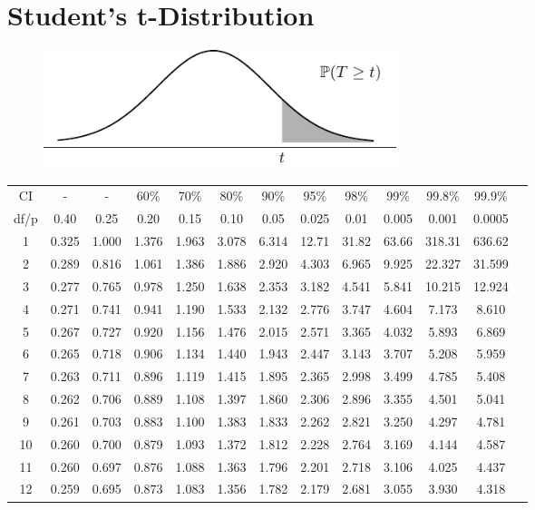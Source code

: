 \chapter{Student’s t-Distribution}
\begin{figure}[H]
\centering
\includegraphics[width=0.5\textwidth]{Figures/Apdx_tTable.pdf}
\end{figure}
\begin{table}[ht]
\centering
\begin{tabular}{c|c c c c c c c c c c c c}
	\hline
	CI & - & - & 60\% & 70\% & 80\% & 90\% & 95\% & 98\% & 99\% & 99.8\% & 99.9\%  \\
	df/p & 0.40 & 0.25 & 0.20 & 0.15 & 0.10 & 0.05 & 0.025 & 0.01 & 0.005 & 0.001 & 0.0005 \\\hline
	1 & 0.325 & 1.000 & 1.376 & 1.963 & 3.078 & 6.314 & 12.71 & 31.82 & 63.66 & 318.31 & 636.62 \\
	2 & 0.289 & 0.816 & 1.061 & 1.386 & 1.886 & 2.920 & 4.303 & 6.965 & 9.925 & 22.327 & 31.599 \\
	3 & 0.277 & 0.765 & 0.978 & 1.250 & 1.638 & 2.353 & 3.182 & 4.541 & 5.841 & 10.215 & 12.924 \\
	4 & 0.271 & 0.741 & 0.941 & 1.190 & 1.533 & 2.132 & 2.776 & 3.747 & 4.604 & 7.173 & 8.610 \\
	5 & 0.267 & 0.727 & 0.920 & 1.156 & 1.476 & 2.015 & 2.571 & 3.365 & 4.032 & 5.893 & 6.869 \\
	6 & 0.265 & 0.718 & 0.906 & 1.134 & 1.440 & 1.943 & 2.447 & 3.143 & 3.707 & 5.208 & 5.959 \\
	7 & 0.263 & 0.711 & 0.896 & 1.119 & 1.415 & 1.895 & 2.365 & 2.998 & 3.499 & 4.785 & 5.408 \\
	8 & 0.262 & 0.706 & 0.889 & 1.108 & 1.397 & 1.860 & 2.306 & 2.896 & 3.355 & 4.501 & 5.041 \\
	9 & 0.261 & 0.703 & 0.883 & 1.100 & 1.383 & 1.833 & 2.262 & 2.821 & 3.250 & 4.297 & 4.781 \\
	10 & 0.260 & 0.700 & 0.879 & 1.093 & 1.372 & 1.812 & 2.228 & 2.764 & 3.169 & 4.144 & 4.587 \\\hline
	11 & 0.260 & 0.697 & 0.876 & 1.088 & 1.363 & 1.796 & 2.201 & 2.718 & 3.106 & 4.025 & 4.437 \\
	12 & 0.259 & 0.695 & 0.873 & 1.083 & 1.356 & 1.782 & 2.179 & 2.681 & 3.055 & 3.930 & 4.318 \\

\end{tabular}
\end{table}
